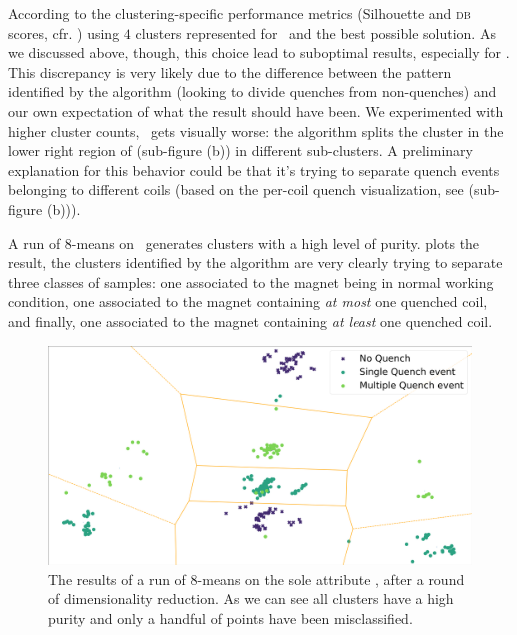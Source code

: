 According to the clustering-specific performance metrics (Silhouette and \textsc{db} scores, cfr.
) using $4$ clusters represented for \an\ and \cnmod the best possible solution.
As we discussed above, though, this choice lead to suboptimal results, especially for \an. This
discrepancy is very likely due to the difference between the pattern identified by the algorithm
(looking to divide quenches from non-quenches) and our own expectation of what the result should
have been. We experimented with higher cluster counts, \cnmod\ gets visually worse: the
algorithm splits the cluster in the lower right region of  (sub-figure (b)) in
different sub-clusters. A preliminary explanation for this behavior could be that it's trying to separate quench
events belonging to different coils (based on the per-coil quench visualization, see
 (sub-figure (b))).

A run of $8$-means on \an\ generates clusters with a high level of purity.  plots the result, the clusters identified by the algorithm are very clearly trying to separate three classes of samples: one associated to the magnet being in normal working condition, one associated to the magnet containing \emph{at most} one quenched coil, and finally, one associated to the magnet containing \emph{at least} one quenched coil.
\begin{figure}[!ht]
	\centering
	\includegraphics[width=0.6\linewidth]{img/clustering_an_qlp_8c.png}
	\caption{The results of a run of $8$-means on the sole attribute \an, after a round of \pca
		dimensionality reduction. As we can see all clusters have a high purity and only a handful of points have been misclassified.}\label{fig:clustering-an}
\end{figure}

